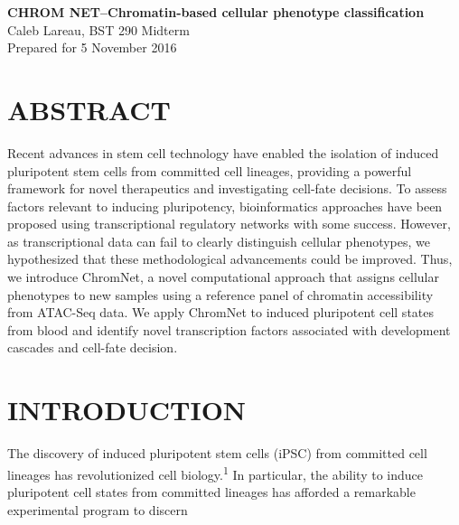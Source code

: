 \documentclass[12pt]{article}
\begin{document}
    \begin{flushleft}
    \textbf{
    {\huge C}{\Large HROM} {\huge N}{\Large ET--Chromatin-based cellular phenotype classification}}\\
     \hspace*{4mm} Caleb Lareau, BST 290 Midterm\\
     \hspace*{4mm} Prepared for 5 November 2016
         \end{flushleft}

\section{\textbf{{\Large A}{\small BSTRACT }}}
Recent advances in stem cell technology have enabled the isolation of induced pluripotent stem cells from committed cell lineages, providing a powerful framework for novel therapeutics and investigating cell-fate decisions. To assess factors relevant to inducing pluripotency, bioinformatics approaches have been proposed using transcriptional regulatory networks with some success. However, as transcriptional data can fail to clearly distinguish cellular phenotypes, we hypothesized that these methodological advancements could be improved. Thus, we introduce ChromNet, a novel computational approach that assigns cellular phenotypes to new samples using a reference panel of chromatin accessibility from ATAC-Seq data. We apply ChromNet to induced pluripotent cell states from blood and identify novel transcription factors associated with development cascades and cell-fate decision. 

 \section{\textbf{{\Large I}{\small NTRODUCTION}}}
The discovery of induced pluripotent stem cells (iPSC) from committed cell lineages has revolutionized cell biology.\textsuperscript{1} In particular, the ability to induce pluripotent cell states from committed lineages has afforded a remarkable experimental program to discern 
\end{document}
